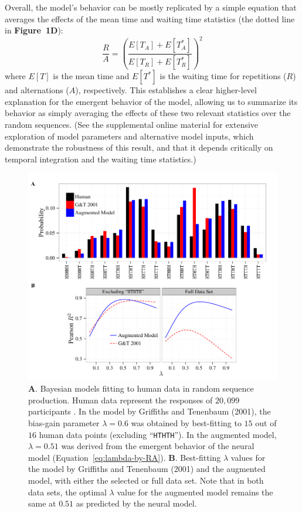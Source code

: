\documentclass[11pt]{article}
\begin{document}
Overall, the model's behavior can be mostly replicated by a simple equation that averages the effects of the mean time and waiting time statistics (the dotted line in \textbf{Figure~1D}):
\begin{equation}\label{eq:time-ratio-squared}
  \frac{R}{A} = \left(\frac{E[T_A]+E[T^*_A]}{E[T_R]+E[T^*_R]}\right)^2
\end{equation}
where $E[T]$ is the mean time and $E[T^*]$ is the waiting time for repetitions ($R$) and alternations ($A$), respectively.
This establishes a clear higher-level explanation for the emergent behavior of the model, allowing us to summarize its behavior as simply averaging the effects of these two relevant statistics over the random sequences.
(See the supplemental online material for extensive exploration of model parameters and alternative model inputs, which demonstrate the robustness of this result, and that it depends critically on temporal integration and the waiting time statistics.)


\begin{figure}[h!b]
  \centering\includegraphics[scale=1]{RND-Figs/Fig2}
  \caption{\textbf{A}. Bayesian models fitting to human data in random sequence production. Human data represent the responses of $20,\!099$ participants \cite{Goodfellow1938}.
  In the model by Griffiths and Tenenbaum (2001), the bias-gain parameter $\lambda = 0.6$ was obtained by best-fitting to $15$ out of $16$ human data points (excluding ``\texttt{HTHTH}'').
  In the augmented model, $\lambda = 0.51$ was derived from the emergent behavior of the neural model (Equation~\ref{eq:lambda-by-RA}).
  \textbf{B}. Best-fitting $\lambda$ values for the model by Griffiths and Tenenbaum (2001) and the augmented model, with either the selected or full data set.
  Note that in both data sets, the optimal $\lambda$ value for the augmented model remains the same at $0.51$ as predicted by the neural model.
  }
  \label{fig2}
\end{figure}
\end{document}
